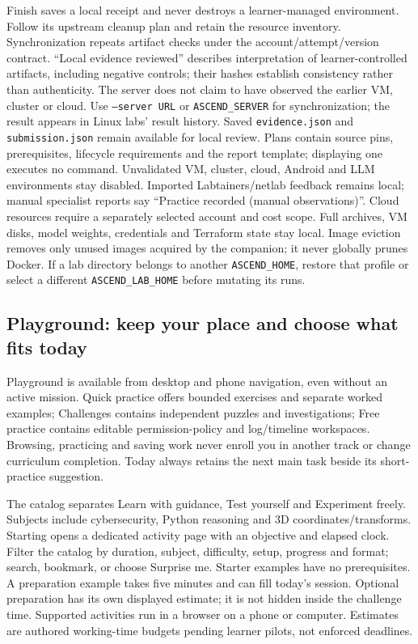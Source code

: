 Finish saves a local receipt and never destroys a learner-managed environment.
Follow its upstream cleanup plan and retain the resource inventory. Synchronization
repeats artifact checks under the account/attempt/version contract. ``Local evidence
reviewed'' describes interpretation of learner-controlled artifacts, including
negative controls; their hashes establish consistency rather than authenticity.
The server does not claim to have observed the earlier VM, cluster or cloud.
Use \texttt{--server URL} or \texttt{ASCEND\_SERVER} for synchronization;
the result appears in Linux labs' result history. Saved \texttt{evidence.json}
and \texttt{submission.json} remain available for local review.
Plans contain source pins, prerequisites, lifecycle requirements and the report
template; displaying one executes no command. Unvalidated VM, cluster, cloud,
Android and LLM environments stay disabled. Imported Labtainers/netlab feedback
remains local; manual specialist reports say ``Practice recorded (manual
observations)''. Cloud resources require a separately selected account and cost
scope. Full archives, VM disks, model weights, credentials and Terraform state
stay local. Image eviction removes only unused images acquired by the companion;
it never globally prunes Docker. If a lab directory belongs to another
\texttt{ASCEND\_HOME}, restore that profile or select a different
\texttt{ASCEND\_LAB\_HOME} before mutating its runs.

\subsection{Playground: keep your place and choose what fits today}
Playground is available from desktop and phone navigation, even without an active
mission. Quick practice offers bounded exercises and separate worked examples;
Challenges contains independent puzzles and investigations; Free practice contains
editable permission-policy and log/timeline workspaces. Browsing, practicing and
saving work never enroll you in another track or change curriculum completion.
Today always retains the next main task beside its short-practice suggestion.

The catalog separates Learn with guidance, Test yourself and Experiment freely.
Subjects include cybersecurity, Python reasoning and 3D coordinates/transforms.
Starting opens a dedicated activity page with an objective and elapsed clock.
Filter the catalog by duration, subject, difficulty, setup, progress and format;
search, bookmark, or choose Surprise me. Starter examples have no prerequisites.
A preparation example takes five minutes and can fill today's session. Optional
preparation has its own displayed estimate; it is not hidden inside the challenge
time. Supported activities run in a browser on a phone or computer. Estimates
are authored working-time budgets pending learner pilots, not enforced deadlines.

